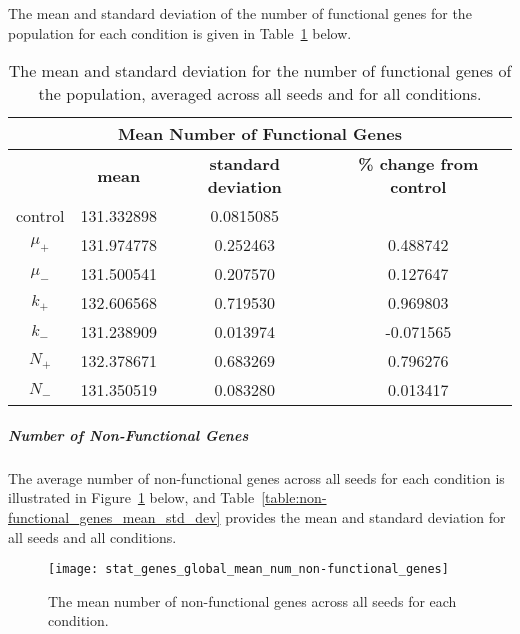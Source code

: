 The mean and standard deviation of the number of functional genes for the population for each condition is given in Table~\ref{table:number_of_genes_mean_std_dev} below.

\begin{table}[H]
	\centering
	\begin{tabular}{|c|c|c|c|}
		\hline
		\multicolumn{4}{c}{\Large \textbf{Mean Number of Functional Genes}} \\
		\hline
		& \textbf{mean} & \textbf{standard deviation} & \textbf{\% change from control} \\
		\hline
		control & 131.332898 & 0.0815085 & \textemdash \\ 
		\hline
		$\mu_+$ & 131.974778 & 0.252463 & 0.488742 \\ 
		\hline
		$\mu_-$ & 131.500541 & 0.207570 & 0.127647 \\ 
		\hline
		$k_+$ & 132.606568 & 0.719530 & 0.969803 \\ 
		\hline
		$k_-$ & 131.238909 & 0.013974 & -0.071565 \\ 
		\hline
		$N_+$ & 132.378671 & 0.683269 & 0.796276 \\ 
		\hline
		$N_-$ & 131.350519 & 0.083280 & 0.013417 \\ 
		\hline
	\end{tabular}
	\caption[Number of functional genes - mean and standard deviation]{The mean and standard deviation for the number of functional genes of the population, averaged across all seeds and for all conditions.}
	\label{table:number_of_genes_mean_std_dev}
\end{table}
\subparagraph{Number of Non-Functional Genes}\label{results:number_non-functional_genes}
The average number of non-functional genes across all seeds for each condition is illustrated in Figure~\ref{fig:mean_num_non-functional_genes} below, and Table~\ref{table:non-functional_genes_mean_std_dev} provides the mean and standard deviation for all seeds and all conditions.  

\begin{figure}[H]
	\centering
	\texttt{[image: stat\_genes\_global\_mean\_num\_non-functional\_genes]}
	\caption[Mean number of non-functional genes]{The mean number of non-functional genes across all seeds for each condition.}
	\label{fig:mean_num_non-functional_genes}
\end{figure}


